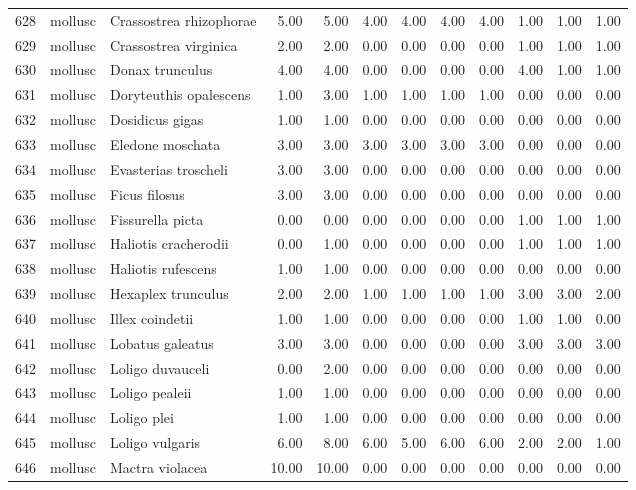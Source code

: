 \begin{table}[ht]
\begin{tabular}{rllrrrrrrrrr}
  628 & mollusc & Crassostrea rhizophorae & 5.00 & 5.00 & 4.00 & 4.00 & 4.00 & 4.00 & 1.00 & 1.00 & 1.00 \\ 
  629 & mollusc & Crassostrea virginica & 2.00 & 2.00 & 0.00 & 0.00 & 0.00 & 0.00 & 1.00 & 1.00 & 1.00 \\ 
  630 & mollusc & Donax trunculus & 4.00 & 4.00 & 0.00 & 0.00 & 0.00 & 0.00 & 4.00 & 1.00 & 1.00 \\ 
  631 & mollusc & Doryteuthis opalescens & 1.00 & 3.00 & 1.00 & 1.00 & 1.00 & 1.00 & 0.00 & 0.00 & 0.00 \\ 
  632 & mollusc & Dosidicus gigas & 1.00 & 1.00 & 0.00 & 0.00 & 0.00 & 0.00 & 0.00 & 0.00 & 0.00 \\ 
  633 & mollusc & Eledone moschata & 3.00 & 3.00 & 3.00 & 3.00 & 3.00 & 3.00 & 0.00 & 0.00 & 0.00 \\ 
  634 & mollusc & Evasterias troscheli & 3.00 & 3.00 & 0.00 & 0.00 & 0.00 & 0.00 & 0.00 & 0.00 & 0.00 \\ 
  635 & mollusc & Ficus filosus & 3.00 & 3.00 & 0.00 & 0.00 & 0.00 & 0.00 & 0.00 & 0.00 & 0.00 \\ 
  636 & mollusc & Fissurella picta & 0.00 & 0.00 & 0.00 & 0.00 & 0.00 & 0.00 & 1.00 & 1.00 & 1.00 \\ 
  637 & mollusc & Haliotis cracherodii & 0.00 & 1.00 & 0.00 & 0.00 & 0.00 & 0.00 & 1.00 & 1.00 & 1.00 \\ 
  638 & mollusc & Haliotis rufescens & 1.00 & 1.00 & 0.00 & 0.00 & 0.00 & 0.00 & 0.00 & 0.00 & 0.00 \\ 
  639 & mollusc & Hexaplex trunculus & 2.00 & 2.00 & 1.00 & 1.00 & 1.00 & 1.00 & 3.00 & 3.00 & 2.00 \\ 
  640 & mollusc & Illex coindetii & 1.00 & 1.00 & 0.00 & 0.00 & 0.00 & 0.00 & 1.00 & 1.00 & 0.00 \\ 
  641 & mollusc & Lobatus galeatus & 3.00 & 3.00 & 0.00 & 0.00 & 0.00 & 0.00 & 3.00 & 3.00 & 3.00 \\ 
  642 & mollusc & Loligo duvauceli & 0.00 & 2.00 & 0.00 & 0.00 & 0.00 & 0.00 & 0.00 & 0.00 & 0.00 \\ 
  643 & mollusc & Loligo pealeii & 1.00 & 1.00 & 0.00 & 0.00 & 0.00 & 0.00 & 0.00 & 0.00 & 0.00 \\ 
  644 & mollusc & Loligo plei & 1.00 & 1.00 & 0.00 & 0.00 & 0.00 & 0.00 & 0.00 & 0.00 & 0.00 \\ 
  645 & mollusc & Loligo vulgaris & 6.00 & 8.00 & 6.00 & 5.00 & 6.00 & 6.00 & 2.00 & 2.00 & 1.00 \\ 
  646 & mollusc & Mactra violacea & 10.00 & 10.00 & 0.00 & 0.00 & 0.00 & 0.00 & 0.00 & 0.00 & 0.00 \\ 

\end{tabular}
\end{table}
